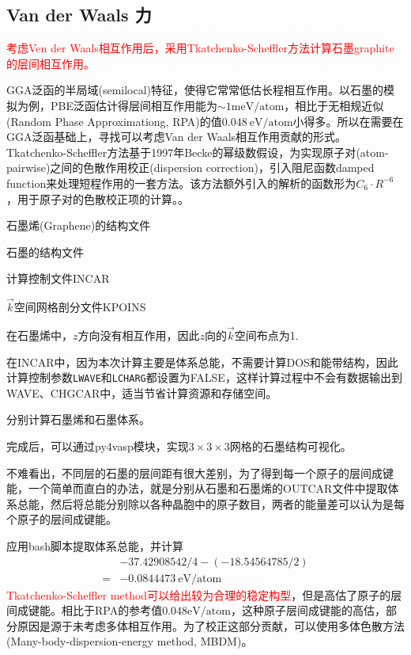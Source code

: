 {{\subsection{\rm{Van der Waals }力}
\textcolor{red}{考虑\textrm{Ven der Waals}相互作用后，采用\textrm{Tkatchenko-Scheffler}方法计算石墨\textrm{graphite}的层间相互作用。}

\textrm{GGA}泛函的半局域\textrm{(semilocal)}特征，使得它常常低估长程相互作用。以石墨的模拟为例，\textrm{PBE}泛函估计得层间相互作用能为$\sim1\mathrm{meV/atom}$，相比于无相规近似\textrm{(Random Phase Approximationg, RPA)}的值$0.048~\mathrm{eV/atom}$小得多。所以在需要在\textrm{GGA}泛函基础上，寻找可以考虑\textrm{Van der Waals}相互作用贡献的形式。\textrm{Tkatchenko-Scheffler}方法基于1997年\textrm{Becke}的幂级数假设，为实现原子对\textrm{(atom-pairwise)}之间的色散作用校正\textrm{(dispersion correction)}，引入阻尼函数\textrm{damped function}来处理短程作用的一套方法。该方法额外引入的解析的函数形为$C_6\cdot R^{-6}$，用于原子对的色散校正项的计算。。

石墨烯\textrm{(Graphene)}的结构文件

石墨的结构文件

计算控制文件\textrm{INCAR}

$\vec k$空间网格剖分文件\textrm{KPOINS}

在石墨烯中，$z$方向没有相互作用，因此$z$向的$\vec k$空间布点为1.

在\textrm{INCAR}中，因为本次计算主要是体系总能，不需要计算\textrm{DOS}和能带结构，因此计算控制参数\texttt{LWAVE}和\texttt{LCHARG}都设置为\textrm{FALSE}，这样计算过程中不会有数据输出到\textrm{WAVE}、\textrm{CHGCAR}中，适当节省计算资源和存储空间。

分别计算石墨烯和石墨体系。

完成后，可以通过\textrm{py4vasp}模块，实现$3\times3\times3$网格的石墨结构可视化。

不难看出，不同层的石墨的层间距有很大差别，为了得到每一个原子的层间成键能，一个简单而直白的办法，就是分别从石墨和石墨烯的\textrm{OUTCAR}文件中提取体系总能，然后将总能分别除以各种晶胞中的原子数目，两者的能量差可以认为是每个原子的层间成键能。

应用\textrm{bash}脚本提取体系总能，并计算
\begin{displaymath}
	\begin{aligned}
		&-37.42908542/4-(-18.54564785/2)\\
		=&-0.0844473~\mathrm{eV/atom}
	\end{aligned}
\end{displaymath}
\textcolor{red}{\textrm{Tkatchenko-Scheffler method}可以给出较为合理的稳定构型}，但是高估了原子的层间成键能。相比于\textrm{RPA}的参考值$0.048\mathrm{eV/atom}$，这种原子层间成键能的高估，部分原因是源于未考虑多体相互作用。为了校正这部分贡献，可以使用多体色散方法\textrm{(Many-body-dispersion-energy method, MBDM)}。

}}
